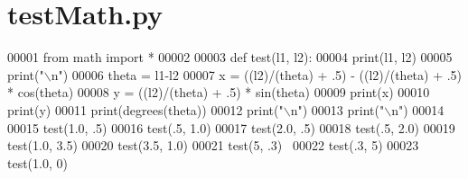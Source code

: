 \section{test\+Math.\+py}

\begin{DoxyCode}
00001 \textcolor{keyword}{from} math \textcolor{keyword}{import} *
00002 
00003 \textcolor{keyword}{def }test(l1, l2):
00004     print(l1, l2)
00005     print(\textcolor{stringliteral}{"\(\backslash\)n"})
00006     theta = l1-l2
00007     x = ((l2)/(theta) + .5) - ((l2)/(theta) + .5) * cos(theta)
00008     y = ((l2)/(theta) + .5) * sin(theta)
00009     print(x)
00010     print(y)
00011     print(degrees(theta))
00012     print(\textcolor{stringliteral}{"\(\backslash\)n"})
00013     print(\textcolor{stringliteral}{"\(\backslash\)n"})
00014 
00015 test(1.0, .5)
00016 test(.5, 1.0)
00017 test(2.0, .5)
00018 test(.5, 2.0)
00019 test(1.0, 3.5)
00020 test(3.5, 1.0)
00021 test(5, .3) 
00022 test(.3, 5)
00023 test(1.0, 0)
\end{DoxyCode}

